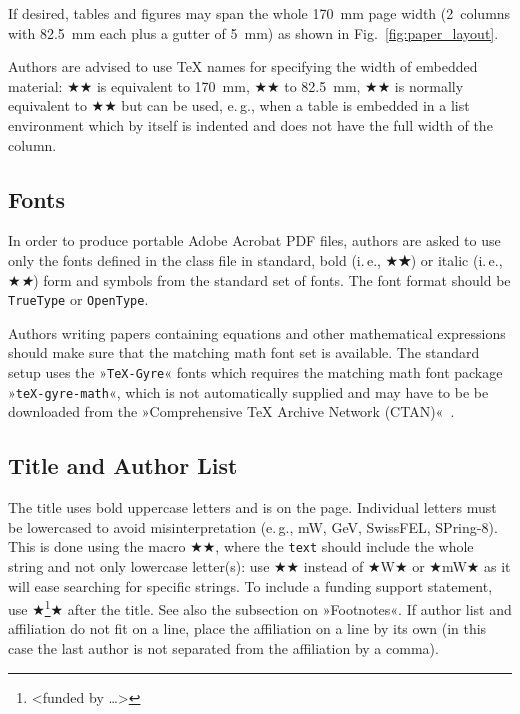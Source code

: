 \documentclass[%
               hyphens,       %
               ]{jacow}
\newcommand{\Lang}[2]{\ifboolexpr{bool{jacowLangGB}}{#1}{#2}}
\begin{document}
If desired, tables and figures may span the whole \qty{170}{mm} page width 
(2~columns with \qty{82.5}{mm} each plus a gutter of \qty{5}{mm}) as shown
in Fig.~\ref{fig:paper_layout}.

Authors are advised to use {\TeX} names for specifying the width of
embedded material: ★\textwidth★ is equivalent to \qty{170}{mm},
★\columnwidth★ to \qty{82.5}{mm}, ★\linewidth★ is normally equivalent to
★\columnwidth★ but can be used, e.\,g., when a table is embedded in a list environment which by itself
is indented and does not have the full width of the column. 


\subsection{Fonts}

In order to produce portable Adobe Acrobat PDF files, authors are asked 
to use only the fonts defined in the class file in standard, 
bold (i.\,e., ★\textbf★) or italic (i.\,e., ★\textit★) form 
and symbols from the standard set of fonts. The font format should be
\texttt{TrueType} or \texttt{OpenType}.

Authors writing papers containing equations and other mathematical expressions
should make sure that the matching math font set is available. The standard 
setup uses the »\texttt{TeX-Gyre}« fonts which requires the matching math font 
package »\texttt{teX-gyre-math}«, which is not automatically 
supplied and may have to be be downloaded from the »Comprehensive {\TeX} Archive Network (CTAN)«~\cite{math-fonts}.

\subsection{Title and Author List}

The title uses bold uppercase letters and is \Lang{centred}{centered} on the page.
Individual letters must be lowercased to avoid misinterpretation (e.\,g., mW, GeV, \mbox{SwissFEL}, \mbox{SPring-8}).
This is done using the macro ★★, where the \texttt{text} should include the whole string 
and not only lowercase letter(s): use ★★ instead of ★W★ or
★\lowercase{m}W★ as it will ease searching for specific strings.
To include a funding support statement, use ★\thanks{<funded by …>}★ after the title. 
See also the subsection on »Footnotes«. If author list and affiliation do not fit on a line, 
place the affiliation on a line by its own 
(in this case the last author is not separated from the affiliation by a comma).
\end{document}
